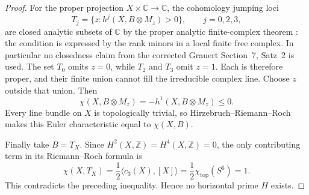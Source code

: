 \begin{proof}
For the proper projection $X\times\mathbb C\to\mathbb C$,
the cohomology jumping loci
\[
 T_j=\{z:h^j(X,B\otimes M_z)>0\},\qquad j=0,2,3,
\]
are closed analytic subsets of $\mathbb C$ by the proper
analytic finite-complex theorem
\cite[Chapter~III, Theorem~4.1]{BS76push}: the condition is
expressed by the rank minors in a local finite free complex.
In particular no closedness claim from the corrected
Grauert Section~7, Satz~2 is used.  The set $T_0$ omits $z=0$,
while $T_2$ and $T_3$ omit $z=1$.  Each is therefore proper,
and their finite union cannot fill the irreducible complex
line.  Choose $z$ outside that union.  Then
\[
 \chi(X,B\otimes M_z)=-h^1(X,B\otimes M_z)\le0.
\]
Every line bundle on $X$ is topologically trivial, so
Hirzebruch--Riemann--Roch makes this Euler characteristic
equal to $\chi(X,B)$.

Finally take $B=T_X$.  Since $H^2(X,\mathbb Z)=H^4(X,\mathbb Z)=0$,
the only contributing term in its Riemann--Roch formula is
\[
 \chi(X,T_X)=\frac12\langle c_3(X),[X]\rangle
            =\frac12\chi_{\mathrm{top}}(S^6)=1.
\]
This contradicts the preceding inequality.  Hence no
horizontal prime $H$ exists.
\end{proof}

